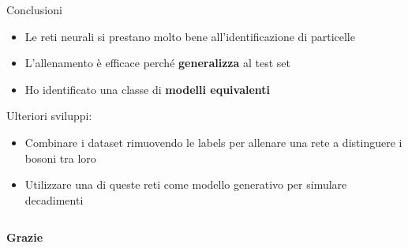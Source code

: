 \documentclass{beamer}
\begin{document}
\begin{frame}{Conclusioni}
  \begin{itemize}
    \item Le reti neurali si prestano molto bene all'identificazione di particelle
    \item L'allenamento è efficace perché \textbf{generalizza} al test set
    \item Ho identificato una classe di \textbf{modelli equivalenti}
  \end{itemize}
  \vspace{2ex}

  Ulteriori sviluppi: 
  \begin{itemize}
    \item Combinare i dataset rimuovendo le labels per allenare una rete a distinguere i bosoni tra loro
    \item Utilizzare una di queste reti come modello generativo per simulare decadimenti
  \end{itemize}
%
  \begin{columns}
    {
      \begin{block}{}
        \centering\vspace*{.5ex}
        \Large\bfseries
        \color{white}
        Grazie%
        \vspace*{.8ex}
      \end{block}
    }
  \end{columns}
\end{frame}
\end{document}
